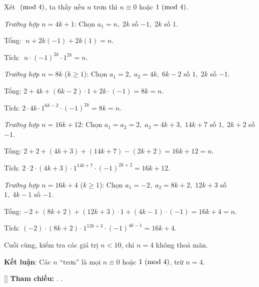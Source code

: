 \documentclass[../2015-n-s.tex]{subfiles}
\begin{document}
\begin{soln}

    Xét \(\ (\mathrm{mod}\ 4)\), ta thấy nếu \( n \) trơn thì \( n \equiv 0\) hoặc \(1 \ (\mathrm{mod}\ 4)\).

    \textit{Trường hợp \( n = 4k + 1 \)}: Chọn \(a_1 = n,\; 2k\) số \(-1,\; 2k\) số \(1\).  

    Tổng: \(\;n + 2k(-1) + 2k(1) = n.\)  

    Tích: \(\;n \cdot (-1)^{2k} \cdot 1^{2k} = n.\)

    \textit{Trường hợp \( n = 8k \)} (\(k \ge 1\)):  
    Chọn \(a_1 = 2,\; a_2 = 4k,\; 6k-2\) số \(1,\; 2k\) số \(-1\).  

    Tổng: \(2 + 4k + (6k-2)\cdot 1 + 2k\cdot(-1) = 8k = n.\)  

    Tích: \(2 \cdot 4k \cdot 1^{6k-2} \cdot (-1)^{2k} = 8k = n.\)

    \textit{Trường hợp \( n = 16k + 12 \)}:  
    Chọn \(a_1 = a_2 = 2,\; a_3 = 4k + 3,\; 14k + 7\) số \(1,\; 2k + 2\) số \(-1\).  

    Tổng: \(2 + 2 + (4k+3) + (14k+7) - (2k+2) = 16k+12 = n.\)  

    Tích: \(2 \cdot 2 \cdot (4k+3) \cdot 1^{14k+7} \cdot (-1)^{2k+2} = 16k+12.\)

    \textit{Trường hợp \( n = 16k + 4 \)} (\(k \ge 1\)):  
    Chọn \(a_1 = -2,\; a_2 = 8k+2,\; 12k+3\) số \(1,\; 4k-1\) số \(-1\).  

    Tổng: \(-2 + (8k+2) + (12k+3)\cdot 1 + (4k-1)\cdot(-1) = 16k+4 = n.\)  
    
    Tích: \((-2) \cdot (8k+2) \cdot 1^{12k+3} \cdot (-1)^{4k-1} = 16k+4.\)

    Cuối cùng, kiểm tra các giá trị \(n<10\), chỉ \(n=4\) không thoả mãn.  

    \textbf{Kết luận}: Các \(n\) “trơn” là mọi \(n \equiv 0\) hoặc \(1 \ (\mathrm{mod}\ 4)\), trừ \(n=4\).

    \vspace{1em}
    [\textbf{}]
    \textbf{Tham chiếu:} . .
\end{soln}

\end{document}
